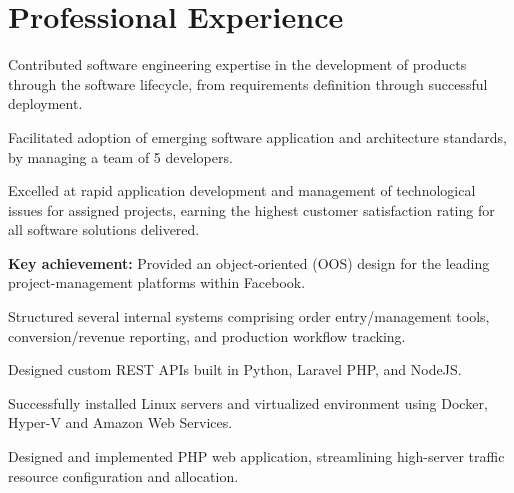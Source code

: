 \documentclass[a4paper]{deedy-resume-openfont} %
\begin{document}
\begin{minipage}[t]{0.60\textwidth} 


\section{Professional Experience}
\vspace{10pt} %
\begin{tightemize}
\item Contributed software engineering expertise in the development of products through the software lifecycle, from requirements definition through successful deployment.
\item Facilitated adoption of emerging software application and architecture standards, by managing a team of 5 developers.
\item Excelled at rapid application development and management of technological issues for assigned projects, earning the highest customer satisfaction rating for all software solutions delivered.
\item {\fontsize{10}{10}\selectfont\bfseries Key achievement:} Provided an object-oriented (OOS) design for the leading project-management platforms within Facebook.
\end{tightemize}
\sectionsep

\begin{tightemize}
\item Structured several internal systems comprising order entry/management tools, conversion/revenue reporting, and production workflow tracking.
\item Designed custom REST APIs built in Python, Laravel PHP, and NodeJS.
\item Successfully installed Linux servers and virtualized environment using Docker, Hyper-V and Amazon Web Services.
\item Designed and implemented PHP web application, streamlining high-server traffic resource configuration and allocation.
\end{tightemize}
\sectionsep



\end{minipage}
\end{document}
